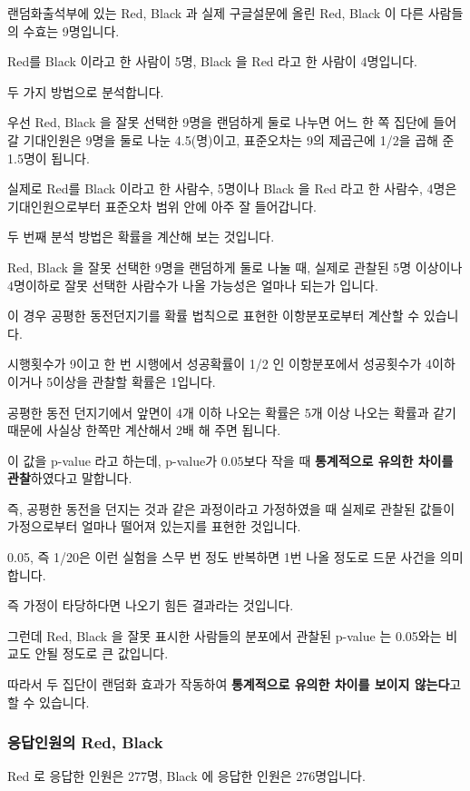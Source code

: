 \documentclass[
]{article}
\begin{document}
랜덤화출석부에 있는 Red, Black 과 실제 구글설문에 올린 Red, Black 이
다른 사람들의 수효는 9명입니다.

Red를 Black 이라고 한 사람이 5명, Black 을 Red 라고 한 사람이 4명입니다.

두 가지 방법으로 분석합니다.

우선 Red, Black 을 잘못 선택한 9명을 랜덤하게 둘로 나누면 어느 한 쪽
집단에 들어갈 기대인원은 9명을 둘로 나눈 4.5(명)이고, 표준오차는 9의
제곱근에 1/2을 곱해 준 1.5명이 됩니다.

실제로 Red를 Black 이라고 한 사람수, 5명이나 Black 을 Red 라고 한
사람수, 4명은 기대인원으로부터 표준오차 범위 안에 아주 잘 들어갑니다.

두 번째 분석 방법은 확률을 계산해 보는 것입니다.

Red, Black 을 잘못 선택한 9명을 랜덤하게 둘로 나눌 때, 실제로 관찰된 5명
이상이나 4명이하로 잘못 선택한 사람수가 나올 가능성은 얼마나 되는가
입니다.

이 경우 공평한 동전던지기를 확률 법칙으로 표현한 이항분포로부터 계산할
수 있습니다.

시행횟수가 9이고 한 번 시행에서 성공확률이 1/2 인 이항분포에서
성공횟수가 4이하이거나 5이상을 관찰할 확률은 1입니다.

공평한 동전 던지기에서 앞면이 4개 이하 나오는 확률은 5개 이상 나오는
확률과 같기 때문에 사실상 한쪽만 계산해서 2배 해 주면 됩니다.

이 값을 p-value 라고 하는데, p-value가 0.05보다 작을 때
\textbf{통계적으로 유의한 차이를 관찰}하였다고 말합니다.

즉, 공평한 동전을 던지는 것과 같은 과정이라고 가정하였을 때 실제로
관찰된 값들이 가정으로부터 얼마나 떨어져 있는지를 표현한 것입니다.

0.05, 즉 1/20은 이런 실험을 스무 번 정도 반복하면 1번 나올 정도로 드문
사건을 의미합니다.

즉 가정이 타당하다면 나오기 힘든 결과라는 것입니다.

그런데 Red, Black 을 잘못 표시한 사람들의 분포에서 관찰된 p-value 는
0.05와는 비교도 안될 정도로 큰 값입니다.

따라서 두 집단이 랜덤화 효과가 작동하여 \textbf{통계적으로 유의한 차이를
보이지 않는다}고 할 수 있습니다.

\subsubsection{응답인원의 Red,
Black}\label{uxc751uxb2f5uxc778uxc6d0uxc758-red-black}

Red 로 응답한 인원은 277명, Black 에 응답한 인원은 276명입니다.
\end{document}
